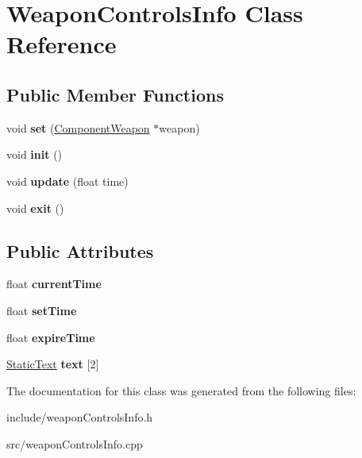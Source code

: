\hypertarget{classWeaponControlsInfo}{
\section{\-Weapon\-Controls\-Info \-Class \-Reference}
\label{d4/d60/classWeaponControlsInfo}
}
\subsection*{\-Public \-Member \-Functions}
\begin{DoxyCompactItemize}
\item 
\hypertarget{classWeaponControlsInfo_a6c1cb415b11115b35366fd5553dd8a80}{
void {\bfseries set} (\hyperlink{classComponentWeapon}{\-Component\-Weapon} $\ast$weapon)}
\label{d4/d60/classWeaponControlsInfo_a6c1cb415b11115b35366fd5553dd8a80}

\item 
\hypertarget{classWeaponControlsInfo_a7ece1ddf65efd9dc4a6b6b6ed0c6f778}{
void {\bfseries init} ()}
\label{d4/d60/classWeaponControlsInfo_a7ece1ddf65efd9dc4a6b6b6ed0c6f778}

\item 
\hypertarget{classWeaponControlsInfo_aa6e982bc6583396a6d5a68c311b5b581}{
void {\bfseries update} (float time)}
\label{d4/d60/classWeaponControlsInfo_aa6e982bc6583396a6d5a68c311b5b581}

\item 
\hypertarget{classWeaponControlsInfo_a78c05545e677a7af24dabe2686b05106}{
void {\bfseries exit} ()}
\label{d4/d60/classWeaponControlsInfo_a78c05545e677a7af24dabe2686b05106}

\end{DoxyCompactItemize}
\subsection*{\-Public \-Attributes}
\begin{DoxyCompactItemize}
\item 
\hypertarget{classWeaponControlsInfo_ad1c4d08b082a0ee711cf2e53d29a003e}{
float {\bfseries current\-Time}}
\label{d4/d60/classWeaponControlsInfo_ad1c4d08b082a0ee711cf2e53d29a003e}

\item 
\hypertarget{classWeaponControlsInfo_ab27f155d715f58ff15ea05c81bacbb67}{
float {\bfseries set\-Time}}
\label{d4/d60/classWeaponControlsInfo_ab27f155d715f58ff15ea05c81bacbb67}

\item 
\hypertarget{classWeaponControlsInfo_ae51d6a788850b0a6ba665541c72430dd}{
float {\bfseries expire\-Time}}
\label{d4/d60/classWeaponControlsInfo_ae51d6a788850b0a6ba665541c72430dd}

\item 
\hypertarget{classWeaponControlsInfo_a83b9010bcd57fe9ae669a33ee509e042}{
\hyperlink{classStaticText}{\-Static\-Text} {\bfseries text} \mbox{[}2\mbox{]}}
\label{d4/d60/classWeaponControlsInfo_a83b9010bcd57fe9ae669a33ee509e042}

\end{DoxyCompactItemize}


\-The documentation for this class was generated from the following files\-:\begin{DoxyCompactItemize}
\item 
include/weapon\-Controls\-Info.\-h\item 
src/weapon\-Controls\-Info.\-cpp\end{DoxyCompactItemize}
